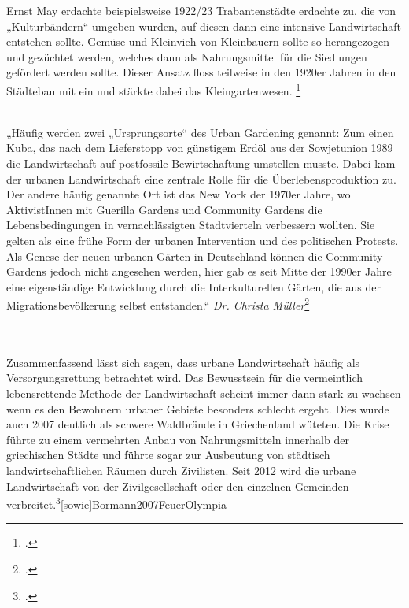 \documentclass{scrartcl}
\begin{document}
Ernst May erdachte beispielsweise 1922/23 Trabantenstädte erdachte zu, die von „Kulturbändern“ umgeben wurden, auf diesen dann eine intensive Landwirtschaft entstehen sollte. Gemüse und Kleinvieh von Kleinbauern sollte so herangezogen und gezüchtet werden, welches dann als Nahrungsmittel für die Siedlungen gefördert werden sollte. Dieser Ansatz floss teilweise in den 1920er Jahren in den Städtebau mit ein und stärkte dabei das Kleingartenwesen. \footcite[Vgl.][S. 145]{MullerUrbanStadt}\\
\\
\begin{displayquote}
„Häufig werden zwei „Ursprungsorte“ des Urban Gardening genannt: Zum einen Kuba, das nach dem Lieferstopp von günstigem Erdöl aus der Sowjetunion 1989 die Landwirtschaft auf postfossile Bewirtschaftung umstellen musste. Dabei kam der urbanen Landwirtschaft eine zentrale Rolle für die Überlebensproduktion zu. Der andere häufig genannte Ort ist das New York der 1970er Jahre, wo AktivistInnen mit Guerilla Gardens und Community Gardens die Lebensbedingungen in vernachlässigten Stadtvierteln verbessern wollten. Sie gelten als eine frühe Form der urbanen Intervention und des politischen Protests. Als Genese der neuen urbanen Gärten in Deutschland können die Community Gardens jedoch nicht angesehen werden, hier gab es seit Mitte der 1990er Jahre eine eigenständige Entwicklung durch die Interkulturellen Gärten, die aus der Migrationsbevölkerung selbst entstanden.“ \textit{Dr. Christa Müller}\footcite{}
\end{displayquote}\\
\\
Zusammenfassend lässt sich sagen, dass urbane Landwirtschaft häufig als Versorgungsrettung betrachtet wird. Das Bewusstsein für die vermeintlich lebensrettende Methode der Landwirtschaft scheint immer dann stark zu wachsen wenn es den Bewohnern urbaner Gebiete besonders schlecht ergeht. Dies wurde auch 2007 deutlich als schwere Waldbrände in Griechenland wüteten. Die Krise führte zu einem vermehrten Anbau von Nahrungsmitteln innerhalb der griechischen Städte und führte sogar zur Ausbeutung von städtisch landwirtschaftlichen Räumen durch Zivilisten. Seit 2012 wird die urbane Landwirtschaft von der Zivilgesellschaft oder den einzelnen Gemeinden verbreitet.\footcite[Vgl.]{Kolokouris2015URBANPROTEST}[sowie]{Bormann2007FeuerOlympia}
\end{document}
